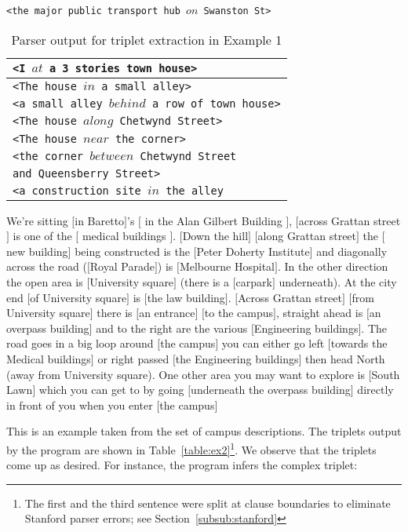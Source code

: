 \documentclass{sig-alternate}
\begin{document}
\texttt{<the major public transport hub $on$ Swanston St>}
\begin{table}
\begin{tabular}{|l|}
\hline
\texttt{<I $at$ a 3 stories town house>}  \\ \hline
\texttt{<The house $in$ a small alley>} \\ \hline
\texttt{<a small alley $behind$ a row of town house>}\\ \hline
\texttt{<The house $along$ Chetwynd Street>}\\ \hline
\texttt{<The house $near$ the corner>}\\ \hline
\texttt{<the corner $between$ Chetwynd Street} \\
\texttt{and Queensberry Street>}\\ \hline
\texttt{<a construction site $in$ the alley}\\ \hline
\end{tabular}
\caption{Parser output for triplet extraction in Example 1}
\label{table:ex1}
\end{table}
\begin{example}
\label{ex:c1}
We're sitting $[$in Baretto$]$'s $[$ in the Alan Gilbert Building $]$, $[$across Grattan street$]$ is one of the $[$ medical buildings $]$. $[$Down the hill$]$ $[$along Grattan street$]$ the $[$new building$]$ being constructed is the $[$Peter Doherty Institute$]$ and diagonally across the road ($[$Royal Parade$]$) is $[$Melbourne Hospital$]$. In the other direction the open area is $[$University square$]$ (there is a $[$carpark$]$ underneath). At the city end $[$of University square$]$ is $[$the law building$]$. $[$Across Grattan street$]$ $[$from University square$]$ there is $[$an entrance$]$ $[$to the campus$]$, straight ahead is $[$an overpass building$]$ and to the right are the various $[$Engineering buildings$]$. The road goes in a big loop around $[$the campus$]$ you can either go left $[$towards the Medical buildings$]$ or right passed $[$the Engineering buildings$]$ then head North (away from University square). One other area you may want to explore is $[$South Lawn$]$ which you can get to by going $[$underneath the overpass building$]$ directly in front of you when you enter $[$the campus$]$ 
\end{example}
This is an example taken from the set of campus descriptions. The triplets output by the program are shown in Table~\ref{table:ex2}\footnote{The first and the third sentence were split at clause boundaries to eliminate Stanford parser errors; see Section~\ref{subsub:stanford}}. We observe that the triplets come up as desired. For instance, the program infers the complex triplet:
\end{document}
